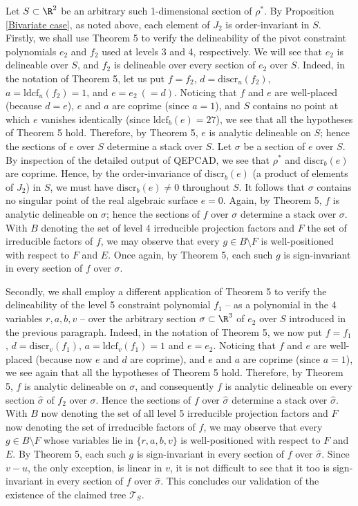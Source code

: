 \documentclass{article}
\begin{document}
Let $S \subset \R^2$ be an arbitrary such 1-dimensional 
section of $\rho^*$. By Proposition \ref{Bivariate case},
as noted above, each element of $J_2$ is order-invariant in $S$.
Firstly, we shall use Theorem 5 to verify the delineability of the
pivot constraint polynomials $e_2$ and $f_2$ used at levels 3
and 4, respectively. We will see that $e_2$ is delineable over $S$,
and $f_2$ is delineable over every section of $e_2$ over $S$.
Indeed, in the notation of Theorem 5,
let us put $f = f_2$, $d = \mathrm{discr}_u(f_2)$,
$a = \mathrm{ldcf}_u(f_2) = 1$, and $e = e_2~(= d)$.
Noticing that $f$ and $e$ are well-placed (because $d = e$),
$e$ and $a$ are coprime (since $a = 1$), and $S$ contains no
point at which $e$ vanishes identically (since $\mathrm{ldcf}_b(e) = 27$),
we see that all the hypotheses of Theorem 5 hold.
Therefore, by Theorem 5, $e$ is analytic delineable on $S$;
hence the sections of $e$ over $S$ determine a stack over $S$.
Let $\sigma$ be a section of $e$ over $S$.
By inspection of the detailed output of QEPCAD,
we see that $\rho^*$ and $\mathrm{discr}_b(e)$ are coprime.
Hence, by the order-invariance of $\mathrm{discr}_b(e)$
(a product of elements of $J_2$) in $S$, 
we must have $\mathrm{discr}_b(e) \neq 0$
throughout $S$. It follows that $\sigma$ contains no singular
point of the real algebraic surface $e = 0$.
Again, by Theorem 5, $f$ is analytic delineable on $\sigma$;
hence the sections of $f$ over $\sigma$ determine a stack over $\sigma$.
With $B$ denoting the set of level 4 irreducible projection factors
and $F$ the set of irreducible factors of $f$,
we may observe that every $g \in B \setminus F$ is well-positioned
with respect to $F$ and $E$. Once again, by Theorem 5,
each such $g$ is sign-invariant in every section of $f$ over $\sigma$.

Secondly, we shall employ a different application of Theorem 5
to verify the delineability of the level 5 constraint polynomial $f_1$ -- as a polynomial in the 4 variables $r, a, b, v$ -- 
over the arbitrary section $\sigma \subset \R^3$ of $e_2$ over $S$ 
introduced in the previous paragraph.
Indeed, in the notation of Theorem 5, we now put $f = f_1$,
$d = \mathrm{discr}_v(f_1)$, $a = \mathrm{ldcf}_v(f_1) = 1$
and $e = e_2$. Noticing that $f$ and $e$ are well-placed
(because now $e$ and $d$ are coprime),
and $e$ and $a$ are coprime (since $a = 1$),
we see again that all the hypotheses of Theorem 5 hold.
Therefore, by Theorem 5, $f$ is analytic delineable on $\sigma$,
and consequently $f$ is analytic delineable 
on every section $\hat{\sigma}$ of $f_2$ over $\sigma$.
Hence the sections of $f$ over $\hat{\sigma}$ determine
a stack over $\hat{\sigma}$.
With $B$ now denoting the set of all level 5 irreducible projection factors and $F$ now denoting the set of irreducible factors of $f$,
we may observe that every $g \in B \setminus F$ whose variables
lie in $\{r, a, b, v\}$ is well-positioned with respect to $F$ and $E$.
By Theorem 5, each such $g$ is sign-invariant in every section
of $f$ over $\hat{\sigma}$.
Since $v - u$, the only exception, is linear in $v$,
it is not difficult to see that it too is sign-invariant in
every section of $f$ over $\hat{\sigma}$.
This concludes our validation of the existence of the
claimed tree $\mathcal{T}_S$.
\end{document}
